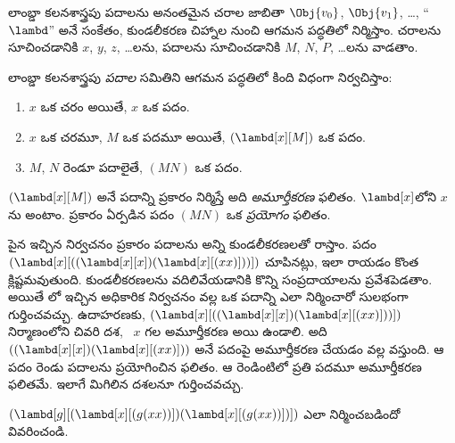 \documentclass[../../../include/open-logic-section]{subfiles}
\begin{document}

లాంబ్డా కలనశాస్త్రపు పదాలను అనంతమైన చరాల జాబితా $\Obj{v_0}$,
$\Obj{v_1}$, \dots, ``$\lambd$'' అనే సంకేతం, కుండలీకరణ చిహ్నాల
నుంచి ఆగమన పద్ధతిలో నిర్మిస్తాం. చరాలను సూచించడానికి $x$, $y$, $z$,
\dots{}లను, పదాలను సూచించడానికి $M$, $N$, $P$, \dots{}లను వాడతాం.

\begin{defn}[పదాలు] 
లాంబ్డా కలనశాస్త్రపు \emph{పదాల} సమితిని ఆగమన పద్ధతిలో కింది విధంగా నిర్వచిస్తాం:
\begin{enumerate}
  \item {} $x$ ఒక చరం అయితే, $x$ ఒక పదం.
  \item {} $x$ ఒక చరమూ, $M$ ఒక పదమూ అయితే,
    $(\lambd[x][M])$ ఒక పదం.
  \item {} $M$, $N$ రెండూ పదాలైతే,
    $(MN)$ ఒక పదం.
\end{enumerate}
\end{defn}

$(\lambd[x][M])$ అనే పదాన్ని  ప్రకారం నిర్మిస్తే
అది \emph{అమూర్తీకరణ} ఫలితం. $\lambd[x]$లోని $x$ను
\emph{} అంటాం.
 ప్రకారం ఏర్పడిన పదం $(MN)$ ఒక
\emph{ప్రయోగం} ఫలితం.

పైన ఇచ్చిన నిర్వచనం ప్రకారం పదాలను అన్ని కుండలీకరణలతో రాస్తాం.
పదం $(\lambd[x][((\lambd[x][x])(\lambd[x][(xx)]))])$ చూపినట్లు, ఇలా
రాయడం కొంత క్లిష్టమవుతుంది.
కుండలీకరణలను వదిలివేయడానికి కొన్ని సంప్రదాయాలను ప్రవేశపెడతాం.
అయితే లో ఇచ్చిన అధికారిక నిర్వచనం వల్ల ఒక పదాన్ని
ఎలా నిర్మించారో సులభంగా గుర్తించవచ్చు. ఉదాహరణకు,
$(\lambd[x][((\lambd[x][x])(\lambd[x][(xx)]))])$ నిర్మాణంలోని చివరి
దశ, ~$x$ గల అమూర్తీకరణ అయి ఉండాలి.
అది $((\lambd[x][x])(\lambd[x][(xx)]))$ అనే పదంపై అమూర్తీకరణ
చేయడం వల్ల వస్తుంది. ఆ పదం రెండు పదాలను ప్రయోగించిన ఫలితం. ఆ రెండింటిలో ప్రతి
పదమూ అమూర్తీకరణ ఫలితమే. ఇలాగే మిగిలిన దశలనూ గుర్తించవచ్చు.

\begin{prob}
$(\lambd[g][(\lambd[x][(g (x x))])
  (\lambd[x][(g (x x))])])$ ఎలా నిర్మించబడిందో వివరించండి.
\end{prob}
\end{document}
